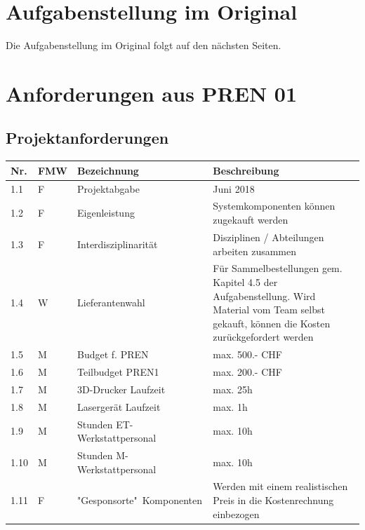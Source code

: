 \documentclass[a4paper]{report}
\begin{document}
\appendix

\chapter{Aufgabenstellung im Original}
\label{app:ch:AufgabenOriginal}
Die Aufgabenstellung im Original folgt auf den nächsten Seiten.



\chapter{Anforderungen aus PREN 01}
\label{app:ch:Anforderungen}
\section{Projektanforderungen}
\label{app:sec:ProjektAnf}
\begin{tabular}{|p{}|p{}|p{}|p{}|}
	\hline
	\textbf{Nr.} & \textbf{FMW\footnotemark} & \textbf{Bezeichnung} & \textbf{Beschreibung} \\
	\hline
	1.1 & F & Projektabgabe & Juni 2018 \\
	\hline
	1.2 & F & Eigenleistung & Systemkomponenten können zugekauft werden \\
	\hline
	1.3 & F & Interdisziplinarität & Disziplinen / Abteilungen arbeiten zusammen \\
	\hline
	1.4 & W & Lieferantenwahl & Für Sammelbestellungen gem. Kapitel 4.5 der Aufgabenstellung. Wird Material vom Team selbst gekauft, können die Kosten zurückgefordert werden \\
	\hline
	1.5 & M & Budget f. PREN & max. 500.- CHF \\
	\hline
	1.6 & M & Teilbudget PREN1 & max. 200.- CHF \\
	\hline
	1.7 & M & 3D-Drucker Laufzeit & max. 25h \\
	\hline
	1.8 & M & Lasergerät Laufzeit & max. 1h \\
	\hline
	1.9 & M & Stunden ET-Werkstattpersonal & max. 10h \\
	\hline
	1.10 & M & Stunden M-Werkstattpersonal & max. 10h \\
	\hline
	1.11 & F & "Gesponsorte"\ Komponenten & Werden mit einem realistischen Preis in die Kostenrechnung einbezogen \\
	\hline
\end{tabular}
\end{document}
